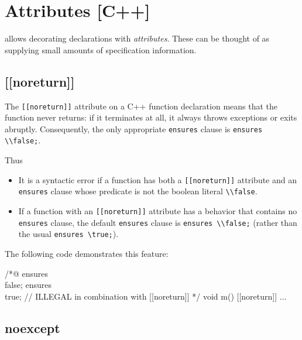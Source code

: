 \section{Attributes [C++]}
\label{sec:attributes}

\experimental

\lang allows decorating declarations with \textit{attributes}. 
These can be thought of as supplying small amounts of specification information.

\subsection{[[noreturn]]}
\label{sec:noreturn}

The \lstinline|[[noreturn]]| attribute on a C++ function declaration means
that the function never returns: if it terminates at all, it always throws 
exceptions or exits abruptly. Consequently, the only appropriate \lstinline|ensures| clause
is \lstinline|ensures \\false;|.

Thus
\begin{itemize}
\item It is a syntactic error if a function has both a \lstinline|[[noreturn]]|
attribute and an \lstinline|ensures| clause whose predicate is not the 
boolean literal \lstinline|\\false|.
\item If a function with an \lstinline|[[noreturn]]| attribute has a behavior
that contains no \lstinline|ensures| clause, the default \lstinline|ensures|
clause is \lstinline|ensures \\false;| (rather than the usual \lstinline|ensures \true;|).
\end{itemize}

The following code demonstrates this feature:
\begin{example}
/*@
ensures \\false;
ensures \\true; // ILLEGAL in combination with [[noreturn]]
*/
void m() [[noreturn]] { ... }
\end{example}


\subsection{noexcept}
\label{sec:noexcept}


